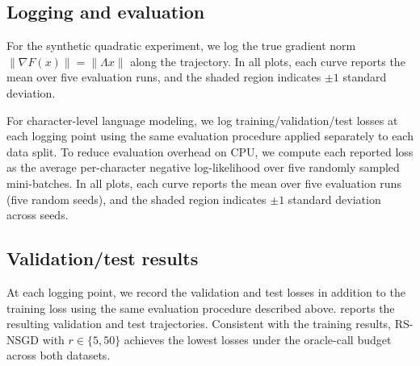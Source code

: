 \documentclass[10pt]{article}
\begin{document}
\subsection{Logging and evaluation}
For the synthetic quadratic experiment, we log the true gradient norm
$\|\nabla F(x)\|=\|\Lambda x\|$ along the trajectory. In all plots, each curve reports the mean over five
evaluation runs, and the shaded region indicates $\pm 1$ standard deviation.





For character-level language modeling, we log training/validation/test losses at each logging point using the same evaluation procedure applied separately to each data split.
To reduce evaluation overhead on CPU, we compute each reported loss as the average per-character negative log-likelihood over five randomly sampled mini-batches.
In all plots, each curve reports the mean over five evaluation runs (five random seeds), and the shaded region indicates $\pm 1$ standard deviation across seeds.
\subsection{Validation/test results}
At each logging point, we record the validation and test losses in addition to the training loss using the
same evaluation procedure described above.  reports the resulting validation and test trajectories.
Consistent with the training results, RS-NSGD with $r\in\{5,50\}$ achieves the lowest losses under the oracle-call budget
across both datasets.
\end{document}
